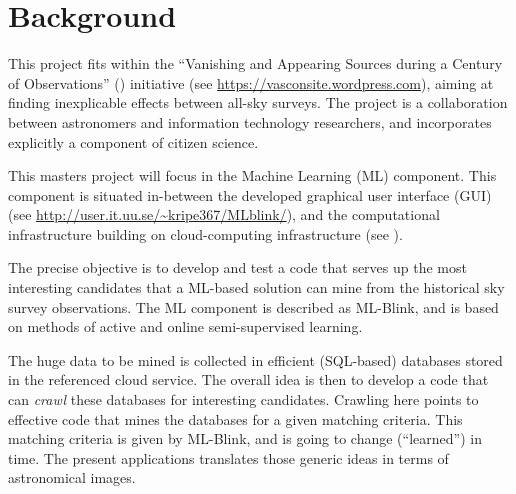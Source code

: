 \section{Background} \label{background}

This project fits within the ``Vanishing and Appearing Sources during a Century of Observations'' (\vasco) initiative (see \url{https://vasconsite.wordpress.com}), aiming at finding inexplicable effects between all-sky surveys. The \vasco project is a collaboration between astronomers and information technology researchers, and incorporates explicitly a component of citizen science.

This masters project will focus in the Machine Learning (ML) component. This component is situated in-between the developed graphical user interface (GUI) (see \url{http://user.it.uu.se/~kripe367/MLblink/}), and the computational infrastructure building on cloud-computing infrastructure (see ).

The precise objective is to develop and test a code that serves up the most interesting candidates that a ML-based solution can mine from the historical sky survey observations. The ML component is described as ML-Blink, and is based on methods of active and online semi-supervised learning.

The huge data to be mined is collected in efficient (SQL-based) databases stored in the referenced cloud service. The overall idea is then to develop a code that can {\em crawl} these databases for interesting candidates. Crawling here points to effective code that mines the databases for a given matching criteria. This matching criteria is given by ML-Blink, and is going to change (``learned'') in time. The present applications translates those generic ideas in terms of astronomical images.